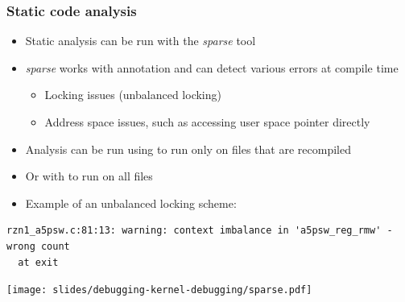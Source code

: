 \begin{frame}[fragile]
  \frametitle{Static code analysis}
  \begin{itemize}
    \item Static analysis can be run with the {\em sparse} tool
    \item {\em sparse} works with annotation and can detect various errors at
          compile time
    \begin{itemize}
      \item Locking issues (unbalanced locking)
      \item Address space issues, such as accessing user space pointer directly
    \end{itemize}
    \item Analysis can be run using  to run only on files that are
          recompiled
    \item Or with  to run on all files
    \item Example of an unbalanced locking scheme:
  \end{itemize}
  \begin{block}{}
    \begin{verbatim}
rzn1_a5psw.c:81:13: warning: context imbalance in 'a5psw_reg_rmw' - wrong count
  at exit
    \end{verbatim}
  \end{block}

  \vspace{0.5cm}
  \begin{center}
    \texttt{[image: slides/debugging-kernel-debugging/sparse.pdf]}
  \end{center}
\end{frame}

